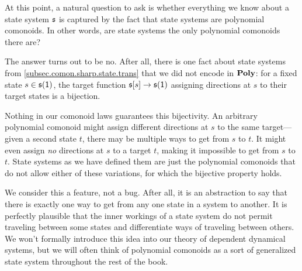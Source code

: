 \documentclass[Book-Poly]{subfiles}
\begin{document}
\begin{example}
At this point, a natural question to ask is whether everything we know about a state system $\mathfrak{s}$ is captured by the fact that state systems are polynomial comonoids.
In other words, are state systems the only polynomial comonoids there are?

The answer turns out to be no.
After all, there is one fact about state systems from \cref{subsec.comon.sharp.state.trans} that we did not encode in $\mathbf{Poly}$: for a fixed state $s\in\mathfrak{s}(\textsf{1})$, the target function $\mathfrak{s}[s]\to\mathfrak{s}(\textsf{1})$ assigning directions at $s$ to their target states is a bijection.

Nothing in our comonoid laws guarantees this bijectivity.
An arbitrary polynomial comonoid might assign different directions at $s$ to the same target---given a second state $t$, there may be multiple ways to get from $s$ to $t$.
It might even assign \emph{no} directions at $s$ to a target $t$, making it impossible to get from $s$ to $t$.
State systems as we have defined them are just the polynomial comonoids that do not allow either of these variations, for which the bijective property holds.

We consider this a feature, not a bug.
After all, it is an abstraction to say that there is exactly one way to get from any one state in a system to another.
It is perfectly plausible that the inner workings of a state system do not permit traveling between some states and differentiate ways of traveling between others.
We won't formally introduce this idea into our theory of dependent dynamical systems, %
but we will often think of polynomial comonoids as a sort of generalized state system throughout the rest of the book.
\end{example}
\end{document}
